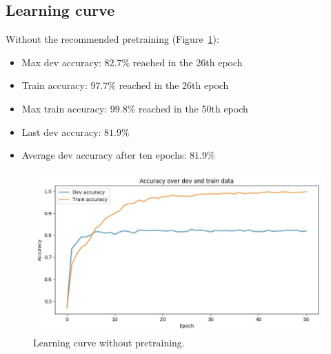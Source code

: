 \subsection{Learning curve}
\begin{minipage}{\linewidth}
Without the recommended pretraining (Figure~\ref{fig:learning_curve}):
\begin{itemize}
	\item Max dev accuracy: $82.7\%$ reached in the 26th epoch
	\item Train accuracy: $97.7\%$ reached in the 26th epoch
	\item Max train accuracy: $99.8\%$ reached in the 50th epoch
	\item Last dev accuracy: $81.9\%$
	\item Average dev accuracy after ten epochs: $81.9\%$
\end{itemize}
\end{minipage}
\begin{figure}[!htb]
	\centering
	\includegraphics[scale=0.5]{learning_curve.jpg}
	\caption{Learning curve without pretraining.}
	\label{fig:learning_curve}
\end{figure}

